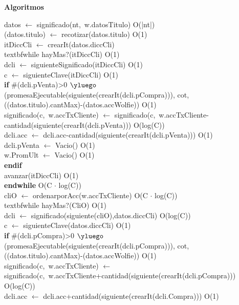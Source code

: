 \documentclass[10pt, a4paper]{article}
\newcommand{\tab}{\hspace*{7mm}}
\newenvironment{Algoritmos}{%
  \vspace*{2ex}%
  \noindent\textbf{\Large Algoritmos}%
  \vspace*{2ex}%
}{}
\begin{document}
\begin{Algoritmos}
\tab datos $\leftarrow$ significado(nt,\ w.datosTitulo) \hfill O(|nt|)
\\ 
\tab (datos.titulo) $\leftarrow$ recotizar(datos.titulo) \hfill O(1)
\\
\tab itDiccCli $\leftarrow$ crearIt(datos.diccCli)
\\
\tab textbf{while} hayMas?(itDiccCli) \hfill O(1)
\\
\tab \tab dcli $\leftarrow$ siguienteSignificado(itDiccCli) \hfill O(1) 
\\
\tab \tab c $\leftarrow$ siguienteClave(itDiccCli) \hfill O(1) 
\\
\tab \tab \textbf{if} $\#$(dcli.pVenta)>0 $\yluego$ (promesaEjecutable(siguiente(crearIt(dcli.pCompra))), cot, ((datos.titulo).cantMax)-(datos.accWolfie)) \hfill O(1)
\\
\tab \tab \tab significado(c,\ w.accTxCliente) $\leftarrow$ significado(c,\ w.accTxCliente-cantidad(siguiente(crearIt(dcli.pVenta))) \hfill O(log(C))
\\
\tab \tab \tab dcli.acc $\leftarrow$ dcli.acc-cantidad(siguiente(crearIt(dcli.pVenta))) \hfill O(1)
\\
\tab \tab \tab dcli.pVenta $\leftarrow$ Vacio() \hfill O(1)
\\
\tab \tab \tab w.PromUlt $\leftarrow$ Vacio() \hfill O(1)
\\
\tab \tab \textbf{endif}
\\
\tab \tab avanzar(itDiccCli) \hfill O(1)
\\
\tab \textbf{endwhile} \hfill O(C $\cdot$ log(C))
\\
\tab cliO $\leftarrow$ ordenarporAcc(w.accTxCliente) \hfill O(C $\cdot$ log(C))
\\
\tab textbf{while} hayMas?(CliO) \hfill O(1)
\\
\tab \tab dcli $\leftarrow$ significado(siguiente(cliO),datos.diccCli) \hfill O(log(C)) 
\\
\tab \tab c $\leftarrow$ siguienteClave(datos.diccCli) \hfill O(1) 
\\
\tab \tab \textbf{if} $\#$(dcli.pCompra)>0 $\yluego$ (promesaEjecutable(siguiente(crearIt(dcli.pCompra))), cot, ((datos.titulo).cantMax)-(datos.accWolfie)) \hfill O(1)
\\
\tab \tab \tab significado(c,\ w.accTxCliente) $\leftarrow$ significado(c,\ w.accTxCliente+cantidad(siguiente(crearIt(dcli.pCompra))) \hfill O(log(C))
\\
\tab \tab \tab dcli.acc $\leftarrow$ dcli.acc+cantidad(siguiente(crearIt(dcli.Compra))) \hfill O(1)
\\

\end{Algoritmos}
\end{document}
